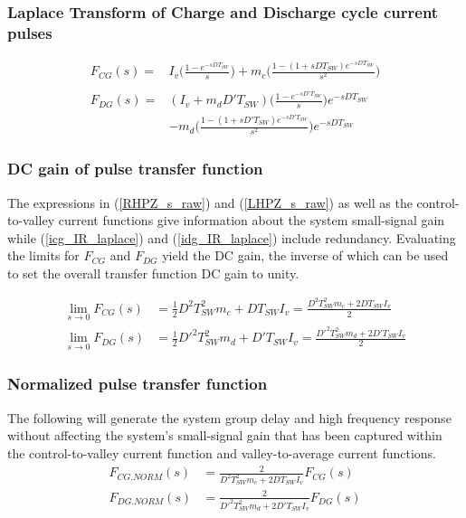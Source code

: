 \documentclass{scrartcl}
\begin{document}
		\subsubsection{Laplace Transform of Charge and Discharge cycle current pulses}	
		
		\begin{align}
		F_{CG}(s) =&   I_{v} \bigg( \frac{1 - e^{-sDT_{SW}}}{s} \bigg)
		+ m_c\bigg( \frac{1 - (1 + sDT_{SW})e^{-sDT_{SW}}}{s^2} \bigg)
		\label{icg_IR_laplace} \\
		\nonumber\\
		F_{DG}(s) =& (I_{v} +m_d D'T_{SW}) \bigg( \frac{1 - e^{-sD'T_{SW}}}{s} \bigg)  e^{-sDT_{SW}}\nonumber\\
		&- m_d \bigg( \frac{1 - (1 + sD'T_{SW})e^{-sD'T_{SW}}}{s^2} \bigg)  e^{-sDT_{SW}}
		\label{idg_IR_laplace}
		\end{align}
		
		\subsubsection{DC gain of pulse transfer function}
		The expressions in (\ref{RHPZ_s_raw}) and (\ref{LHPZ_s_raw}) as well as the control-to-valley current functions give information about the system small-signal gain while (\ref{icg_IR_laplace}) and (\ref{idg_IR_laplace}) include redundancy. Evaluating the limits for $F_{CG}$ and $F_{DG}$ yield the DC gain, the inverse of which can be used to set the overall transfer function DC gain to unity.
		
		\begin{align}
		\lim_{s \to 0} F_{CG}(s) &= \frac{1}{2} D^2 T_{SW}^2m_c + D T_{SW} I_v = \frac{D^2 T_{SW}^2m_c + 2D T_{SW} I_v}{2} \label{lim_FCG} \\
		\lim_{s \to 0} F_{DG}(s) &= \frac{1}{2} D'^2 T_{SW}^2m_d + D' T_{SW} I_v= \frac{D'^2 T_{SW}^2m_d + 2D' T_{SW} I_v}{2} \label{lim_FDG}
		\end{align}
		
		\subsubsection{Normalized pulse transfer function}
		The following will generate the system group delay and high frequency response without affecting the system's small-signal gain that has been captured within the control-to-valley current function and valley-to-average current functions. 
		\begin{align}
		F_{CG.NORM}(s) &= \frac{2}{D^2 T_{SW}^2m_c + 2D T_{SW} I_v} F_{CG}(s)\label{FCG_NORM} \\
		F_{DG.NORM}(s) &= \frac{2}{D'^2 T_{SW}^2m_d + 2D' T_{SW} I_v}F_{DG}(s) \label{FDG_NORM}
		\end{align}
		
\end{document}
